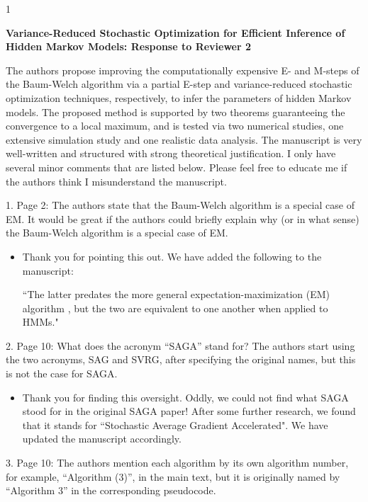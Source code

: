 \documentclass[11pt]{article}
\newcommand{\blind}{1}
\begin{document}
\blind
{
  \bigskip
  \bigskip
  \bigskip
  \begin{center}
    {\LARGE\bf Variance-Reduced Stochastic Optimization for Efficient Inference of Hidden Markov Models: Response to Reviewer 2}
  \end{center}
  \medskip
} \fi

The authors propose improving the computationally expensive E- and M-steps of the Baum-Welch algorithm via a partial E-step and variance-reduced stochastic optimization techniques, respectively, to infer the parameters of hidden Markov models. The proposed method is supported by two theorems guaranteeing the convergence to a local maximum, and is tested via two numerical studies, one extensive simulation study and one realistic data analysis. The manuscript is very well-written and structured with strong theoretical justification. I only have several minor comments that are listed below. Please feel free to educate me if the authors think I misunderstand the manuscript.

1. Page 2: The authors state that the Baum-Welch algorithm is a special case of EM. It would be great if the authors could briefly explain why (or in what sense) the Baum-Welch algorithm is a special case of EM.

\begin{itemize}
    \item Thank you for pointing this out. We have added the following to the manuscript:
    
    ``The latter predates the more general expectation-maximization (EM) algorithm \citep{Dempster:1977}, but the two are equivalent to one another when applied to HMMs."
    
\end{itemize}

2. Page 10: What does the acronym “SAGA” stand for? The authors start using the two acronyms, SAG and SVRG, after specifying the original names, but this is not the case for SAGA.

\begin{itemize}
    \item Thank you for finding this oversight. Oddly, we could not find what SAGA stood for in the original SAGA paper! After some further research, we found that it stands for ``Stochastic Average Gradient Accelerated". We have updated the manuscript accordingly.
\end{itemize}

3. Page 10: The authors mention each algorithm by its own algorithm number, for example, ``Algorithm (3)”, in the main text, but it is originally named by ``Algorithm 3” in the corresponding pseudocode.
\end{document}
